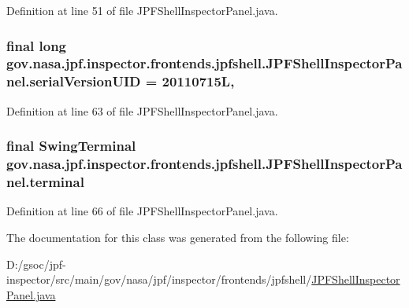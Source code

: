 Definition at line 51 of file J\+P\+F\+Shell\+Inspector\+Panel.\+java.

\subsubsection[{\texorpdfstring{serial\+Version\+U\+ID}{serialVersionUID}}]{\setlength{\rightskip}{0pt plus 5cm}final long gov.\+nasa.\+jpf.\+inspector.\+frontends.\+jpfshell.\+J\+P\+F\+Shell\+Inspector\+Panel.\+serial\+Version\+U\+ID = 20110715L\hspace{0.3cm}{\ttfamily [static]}, {\ttfamily [private]}}\hypertarget{classgov_1_1nasa_1_1jpf_1_1inspector_1_1frontends_1_1jpfshell_1_1_j_p_f_shell_inspector_panel_ac93732cf086af817ef4051ff4e157d15}{}\label{classgov_1_1nasa_1_1jpf_1_1inspector_1_1frontends_1_1jpfshell_1_1_j_p_f_shell_inspector_panel_ac93732cf086af817ef4051ff4e157d15}


Definition at line 63 of file J\+P\+F\+Shell\+Inspector\+Panel.\+java.

\subsubsection[{\texorpdfstring{terminal}{terminal}}]{\setlength{\rightskip}{0pt plus 5cm}final {\bf Swing\+Terminal} gov.\+nasa.\+jpf.\+inspector.\+frontends.\+jpfshell.\+J\+P\+F\+Shell\+Inspector\+Panel.\+terminal\hspace{0.3cm}{\ttfamily [private]}}\hypertarget{classgov_1_1nasa_1_1jpf_1_1inspector_1_1frontends_1_1jpfshell_1_1_j_p_f_shell_inspector_panel_a444a1b705fa48380375e7a920a140337}{}\label{classgov_1_1nasa_1_1jpf_1_1inspector_1_1frontends_1_1jpfshell_1_1_j_p_f_shell_inspector_panel_a444a1b705fa48380375e7a920a140337}


Definition at line 66 of file J\+P\+F\+Shell\+Inspector\+Panel.\+java.



The documentation for this class was generated from the following file\+:\begin{DoxyCompactItemize}
\item 
D\+:/gsoc/jpf-\/inspector/src/main/gov/nasa/jpf/inspector/frontends/jpfshell/\hyperlink{_j_p_f_shell_inspector_panel_8java}{J\+P\+F\+Shell\+Inspector\+Panel.\+java}\end{DoxyCompactItemize}
